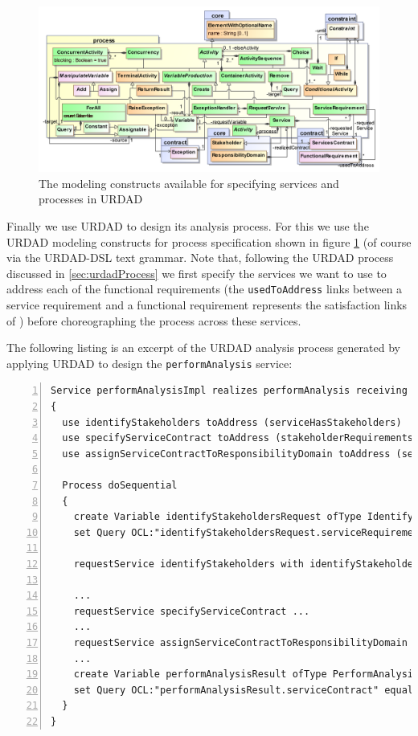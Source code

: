 \begin{figure}[Htbp]
  \centering
  \includegraphics{process}
  \caption{The modeling constructs available for specifying services and processes in URDAD}
  \label{fig:processModule}
\end{figure}

Finally we use URDAD to design its analysis process. For this we use the URDAD modeling constructs for process specification shown in figure \ref{fig:processModule} (of course via the URDAD-DSL text grammar. Note that, following the URDAD process discussed in \ref{sec:urdadProcess} we first specify the services we want to use to address each of the functional requirements (the \verb+usedToAddress+ links between a service requirement and a functional requirement represents the satisfaction links of \cite{ramesh_toward_2001}) before choreographing the process across these services. 

The following listing is an excerpt of the URDAD analysis process generated by applying URDAD to design the \verb+performAnalysis+ service:
\lstset{language=urdad,caption=Specifying the performAnalysis service in the textual URDAD DSL syntax.,label=serviceTextSyntax}
\begin{lstlisting}[numbers=left,escapechar=|]
Service performAnalysisImpl realizes performAnalysis receiving Variable performAnalysisRequest ofType PerformAnalysisRequest 
{
  use identifyStakeholders toAddress (serviceHasStakeholders) 
  use specifyServiceContract toAddress (stakeholderRequirementsConsistent serviceContractSpecified)
  use assignServiceContractToResponsibilityDomain toAddress (serviceContractAssignedToResponsibilityDomain)
 
  Process doSequential
  {
    create Variable identifyStakeholdersRequest ofType IdentifyStakeholdersRequest
    set Query OCL:"identifyStakeholdersRequest.serviceRequirements" equalTo Query OCL:"performAnalysisRequest.serviceRequirements"
    
    requestService identifyStakeholders with identifyStakeholdersRequest yielding Variable identifyStakeholdersResult ofType IdentifyStakeholdersResult on NoStakeholdersException raiseException NoStakeholdersException

    ...
    requestService specifyServiceContract ...
    ...
    requestService assignServiceContractToResponsibilityDomain ...
    ...
    create Variable performAnalysisResult ofType PerformAnalysisResult
    set Query OCL:"performAnalysisResult.serviceContract" equalTo Query OCL:"specifyServiceContractResult.serviceContract"  
  }                              
}
\end{lstlisting}
